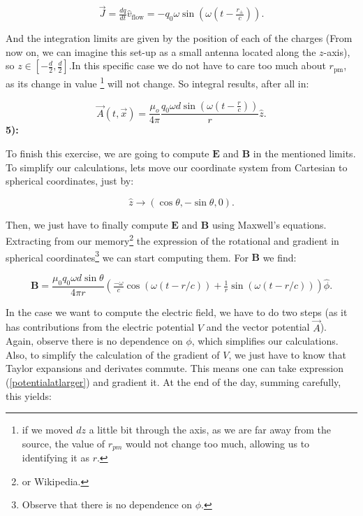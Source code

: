 \begin{equation}
	\vec{J} = \tfrac{dq}{dt}\hat{v}_{\mathrm{flow}} = -q_{0}\omega \sin \left(\omega(t-\tfrac{r_{\pm}}{c})\right).
\end{equation}

And the integration limits are given by the position of each of the charges (From now on, we can imagine this set-up as a small antenna located along the $z$-axis), so $z \in [-\tfrac{d}{2},\tfrac{d}{2}]$.In this specific case we do not have to care too much about $r_{\mathrm{pm}}$, as its change in value \footnote{if we moved $dz$ a little bit through the axis, as we are far away from the source, the value of $r_{pm}$ would not change too much, allowing us to identifying it as $r$.} will not change. So integral results, after all in:

\begin{equation}
	\vec{A}(t,\vec{x}) = \frac{\mu_{o}}{4\pi}\frac{q_{0}\omega d \sin \left(\omega(t-\tfrac{r}{c})\right)}{r} \hat{z}.
\end{equation}
\textbf{5):}

To finish this exercise, we are going to compute $\mathbf{E}$ and $\mathbf{B}$ in the mentioned limits. To simplify our calculations, lets move our coordinate system from Cartesian to spherical coordinates, just by:

\begin{equation}
	\hat{z}\rightarrow (\cos \theta, -\sin\theta,0).
\end{equation}

Then, we just have to finally compute $\mathbf{E}$ and $\mathbf{B}$ using Maxwell's equations. Extracting from our memory\footnote{or Wikipedia.} the expression of the rotational and gradient in spherical coordinates\footnote{Observe that there is no dependence on $\phi$.} we can start computing them. For $\mathbf{B}$ we find:

\begin{equation}
	\mathbf{B} = \frac{\mu_{0}q_{0}\omega d \sin\theta }{4\pi r} \left( \tfrac{-\omega}{c} \cos\left(\omega(t-r/c)\right) + \tfrac{1}{r}\sin\left(\omega(t-r/c)\right) \right)\hat{\phi}.
\end{equation}

In the case we want to compute the electric field, we have to do two steps (as it has contributions from the electric potential $V$ and the vector  potential $\vec{A}$). Again, observe there is no dependence on $\phi$, which simplifies our calculations. Also, to simplify the calculation of the gradient of $V$, we just have to know that Taylor expansions and derivates commute. This means one can take expression (\ref{potentialatlarger}) and gradient it. At the end of the day, summing carefully, this yields:

